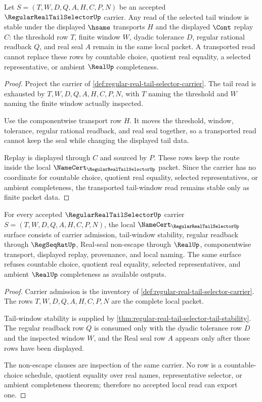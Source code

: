\begin{theorem}
\label{thm:regular-real-tail-selector-tail-stability}
Let $S=(T,W,D,Q,A,H,C,P,N)$ be an accepted $\RegularRealTailSelectorUp$ carrier. Any read of the selected tail window is stable under the displayed $\hsame$ transports $H$ and the displayed $\Cont$ replay $C$: the threshold row $T$, finite window $W$, dyadic tolerance $D$, regular rational readback $Q$, and real seal $A$ remain in the same local packet. A transported read cannot replace these rows by countable choice, quotient real equality, a selected representative, or ambient $\RealUp$ completeness.
\end{theorem}
\begin{proof}
Project the carrier of \autoref{def:regular-real-tail-selector-carrier}. The tail read is exhausted by $T,W,D,Q,A,H,C,P,N$, with $T$ naming the threshold and $W$ naming the finite window actually inspected.

Use the componentwise transport row $H$. It moves the threshold, window, tolerance, regular rational readback, and real seal together, so a transported read cannot keep the seal while changing the displayed tail data.

Replay is displayed through $C$ and sourced by $P$. These rows keep the route inside the local $\NameCert_{\RegularRealTailSelectorUp}$ packet. Since the carrier has no coordinate for countable choice, quotient real equality, selected representatives, or ambient completeness, the transported tail-window read remains stable only as finite packet data.
\end{proof}

\begin{theorem}
\label{thm:regular-real-tail-selector-namecert-obligations}
For every accepted $\RegularRealTailSelectorUp$ carrier $S=(T,W,D,Q,A,H,C,P,N)$, the local $\NameCert_{\RegularRealTailSelectorUp}$ surface consists of carrier admission, tail-window stability, regular readback through $\RegSeqRatUp$, Real-seal non-escape through $\RealUp$, componentwise transport, displayed replay, provenance, and local naming. The same surface refuses countable choice, quotient real equality, selected representatives, and ambient $\RealUp$ completeness as available outputs.
\end{theorem}
\begin{proof}
Carrier admission is the inventory of \autoref{def:regular-real-tail-selector-carrier}. The rows $T,W,D,Q,A,H,C,P,N$ are the complete local packet.

Tail-window stability is supplied by \autoref{thm:regular-real-tail-selector-tail-stability}. The regular readback row $Q$ is consumed only with the dyadic tolerance row $D$ and the inspected window $W$, and the Real seal row $A$ appears only after those rows have been displayed.

The non-escape clauses are inspection of the same carrier. No row is a countable-choice schedule, quotient equality over real names, representative selector, or ambient completeness theorem; therefore no accepted local read can export one.
\end{proof}

